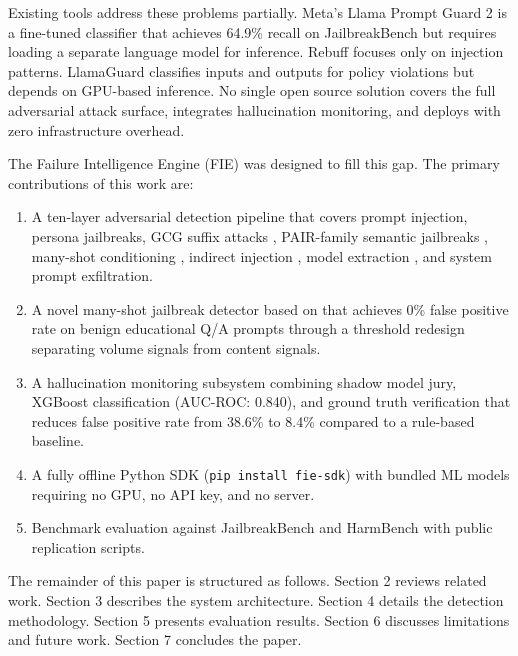 \documentclass[preprint,12pt,authoryear]{elsarticle}
\begin{document}
Existing tools address these problems partially. Meta's Llama Prompt
Guard 2 \citep{metallamaguard2024} is a fine-tuned classifier that
achieves 64.9\% recall on JailbreakBench but requires loading a
separate language model for inference. Rebuff focuses only on
injection patterns. LlamaGuard \citep{inan2023llamaguard} classifies
inputs and outputs for policy violations but depends on GPU-based
inference. No single open source solution covers the full adversarial
attack surface, integrates hallucination monitoring, and deploys with
zero infrastructure overhead.

The Failure Intelligence Engine (FIE) was designed to fill this gap.
The primary contributions of this work are:

\begin{enumerate}
  \item A ten-layer adversarial detection pipeline that covers prompt
        injection, persona jailbreaks, GCG suffix attacks
        \citep{zou2023universal}, PAIR-family semantic jailbreaks
        \citep{chao2023jailbreaking}, many-shot conditioning
        \citep{anil2024manyshot}, indirect injection
        \citep{greshake2023indirect}, model extraction
        \citep{tramer2016stealing}, and system prompt exfiltration.

  \item A novel many-shot jailbreak detector based on \citet{anil2024manyshot}
        that achieves 0\% false positive rate on benign educational
        Q/A prompts through a threshold redesign separating volume
        signals from content signals.

  \item A hallucination monitoring subsystem combining shadow model
        jury, XGBoost classification (AUC-ROC: 0.840), and ground
        truth verification that reduces false positive rate from
        38.6\% to 8.4\% compared to a rule-based baseline.

  \item A fully offline Python SDK (\texttt{pip install fie-sdk}) with
        bundled ML models requiring no GPU, no API key, and no server.

  \item Benchmark evaluation against JailbreakBench
        \citep{chao2024jailbreakbench} and HarmBench
        \citep{mazeika2024harmbench} with public replication scripts.
\end{enumerate}

The remainder of this paper is structured as follows. Section 2
reviews related work. Section 3 describes the system architecture.
Section 4 details the detection methodology. Section 5 presents
evaluation results. Section 6 discusses limitations and future work.
Section 7 concludes the paper.
\end{document}
